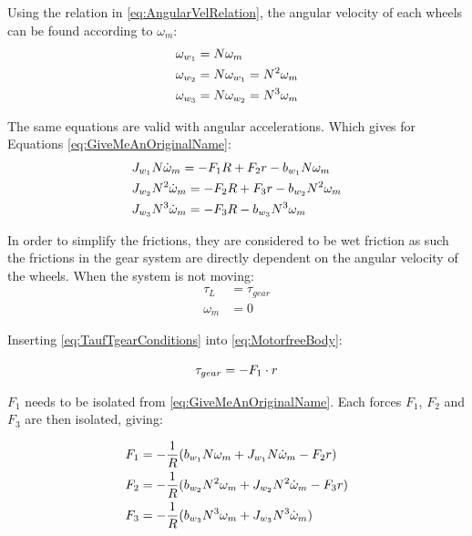 Using the relation in \autoref{eq:AngularVelRelation}, the angular velocity of each wheels can be found according to $\omega_m$:
\begin{subequations} 
	\begin{flalign}
		&\omega_{w_1} = N \omega_m \addunit{\radian\per\second}\\
		&\omega_{w_2} = N \omega_{w_1} = N^2 \omega_m \addunit{\radian\per\second}\\
		&\omega_{w_3} = N \omega_{w_2} = N^3 \omega_m \addunit{\radian\per\second}
	\end{flalign}
\end{subequations}

The same equations are valid with angular accelerations.
Which gives for Equations \ref{eq:GiveMeAnOriginalName}:
\begin{subequations} 
	\begin{flalign}  
		&J_{w_1}N\dot{\omega}_m = -F_1R + F_2r -b_{w_1}N\omega_m \addunit{\newton\meter}\\ 
		&J_{w_2}N^2\dot{\omega}_m = -F_2R + F_3r -b_{w_2}N^2\omega_m  \addunit{\newton\meter}\\ 
		&J_{w_3}N^3\dot{\omega}_m = -F_3R - b_{w_3}N^3\omega_m  \addunit{\newton\meter}
	\end{flalign}
\end{subequations}

In order to simplify the frictions, they are considered to be wet friction as such the frictions in the gear system are directly dependent on the angular velocity of the wheels. When the system is not moving:
\begin{subequations} 
	\begin{flalign}  \label{eq:TaufTgearConditions}
	\tau_L &= \tau_{gear}\\
	\omega_m &= 0
	\end{flalign}
\end{subequations}

Inserting \autoref{eq:TaufTgearConditions} into \autoref{eq:MotorfreeBody}:

\begin{equation} 
		\tau_{gear} = -F_1 \cdot r \addunit{\newton\meter}
		\label{eq:TaufF1r}
\end{equation}

$F_1$ needs to be isolated from \autoref{eq:GiveMeAnOriginalName}. Each forces $F_1$, $F_2$ and $F_3$ are then isolated, giving: 

\begin{subequations} 
	\begin{flalign}
		&F_1 = -\frac{1}{R} (b_{w_1}N\omega_m + J_{w_1}N\dot{\omega}_m - F_2r) \addunit{\newton} 	\label{eq:F1}\\ 
		&F_2 = -\frac{1}{R} (b_{w_2}N^2\omega_m +  J_{w_2}N^2\dot{\omega}_m - F_3r) \addunit{\newton}	\label{eq:F2}\\
		&F_3 = -\frac{1}{R} (b_{w_3}N^3\omega_m + J_{w_3}N^3\dot{\omega}_m)	\addunit{\newton}		\label{eq:F3}
	\end{flalign}
\end{subequations}

